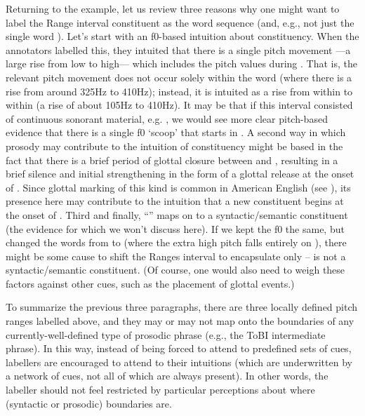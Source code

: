 Returning to the example, let us review three reasons why one might want to label the Range interval constituent as the word sequence  (and, e.g., not just the single word ). Let’s start with an f0-based intuition about constituency. When the annotators labelled this, they intuited that there is a single pitch movement —a large rise from low to high— which includes the pitch values during . That is, the relevant pitch movement does not occur solely within the word  (where there is a rise from around 325Hz to 410Hz); instead, it is intuited as a rise from within  to within  (a rise of about 105Hz to 410Hz). It may be that if this interval consisted of continuous sonorant material, e.g. , we would see more clear pitch-based evidence that there is a single f0 ‘scoop’ that starts in . A second way in which prosody may contribute to the intuition of constituency might be based in the fact that there is a brief period of glottal closure between  and , resulting in a brief silence and initial strengthening in the form of a glottal release at the onset of . Since glottal marking of this kind is common in American English (see \citealt{dilley-96}), its presence here may contribute to the intuition that a new constituent begins at the onset of . Third and finally, “” maps on to a syntactic\slash semantic constituent (the evidence for which we won’t discuss here). If we kept the f0 the same, but changed the words from  to  (where the extra high pitch falls entirely on ), there might be some cause to shift the Ranges interval to encapsulate only  –  is not a syntactic\slash semantic constituent. (Of course, one would also need to weigh these factors against other cues, such as the placement of glottal events.)

To summarize the previous three paragraphs, there are three locally defined pitch ranges labelled above, and they may or may not map onto the boundaries of any currently-well-defined type of prosodic phrase (e.g., the ToBI intermediate phrase). In this way, instead of being forced to attend to predefined sets of cues, labellers are encouraged to attend to their intuitions (which are underwritten by a network of cues, not all of which are always present). In other words, the labeller should not feel restricted by particular perceptions about where (syntactic or prosodic) boundaries are.

